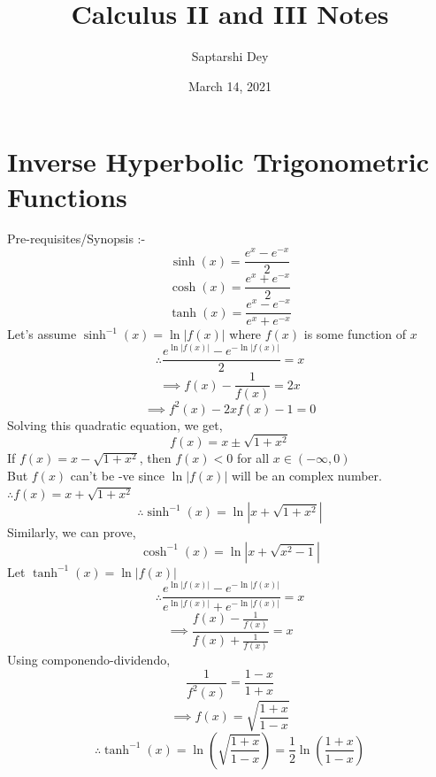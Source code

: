 \documentclass[14pt]{article}
\begin{document}
	\title{Calculus II and III Notes}
	\author{Saptarshi Dey}
	\date{March 14, 2021}
	\maketitle
	\section{Inverse Hyperbolic Trigonometric Functions}
	\large{Pre-requisites/Synopsis :-}
	\begin{equation}
		\sinh(x)=\frac{e^x-e^{-x}}{2}
	\end{equation}
	\begin{equation}
		\cosh(x)=\frac{e^x+e^{-x}}{2}
	\end{equation}
	\begin{equation}
		\tanh(x)=\frac{e^x-e^{-x}}{e^x+e^{-x}}
	\end{equation}
	Let's assume $\sinh^{-1}(x)=\ln|f(x)|$ where $f(x)$ is some function of $x$ 
	\\ \begin{equation*}
	\therefore \frac{e^{\ln|f(x)|}-e^{-\ln|f(x)|}}{2} = x	
	\end{equation*}
	\begin{equation*}					%
	\implies f(x)-\frac{1}{f(x)} = 2x		
	\end{equation*}
	\begin{equation*}
	\implies f^2(x)-2xf(x)-1 = 0		
	\end{equation*}
	Solving this quadratic equation, we get,
	\begin{equation*}
		f(x)=x\pm\sqrt{1+x^2}
	\end{equation*}
	If $f(x)=x-\sqrt{1+x^2}$, then $f(x)<0$ for all $x\in(-\infty,0)$
	\\ But $f(x)$ can't be -ve since $\ln|f(x)|$ will be an complex number.
	$\therefore f(x)=x+\sqrt{1+x^2}$
	\begin{equation}
		\therefore \boxed{\sinh^{-1}(x)=\ln|x+\sqrt{1+x^2}|}
	\end{equation}
	Similarly, we can prove,
	\begin{equation}
	\boxed{\cosh^{-1}(x)=\ln|x+\sqrt{x^2-1}|}
	\end{equation}
	Let $\tanh^{-1}(x)=\ln|f(x)|$
	\begin{equation*}
		\therefore \frac{e^{\ln|f(x)|}-e^{-\ln|f(x)|}}{e^{\ln|f(x)|}+e^{-\ln|f(x)|}}=x
	\end{equation*}
	\begin{equation*}
	\implies \frac{f(x)-\frac{1}{f(x)}}{f(x)+\frac{1}{f(x)}}=x
	\end{equation*}
	Using componendo-dividendo,
	\begin{equation*}
	\frac{1}{f^2(x)}=\frac{1-x}{1+x}
	\end{equation*}
	\begin{equation*}
	\implies f(x)=\sqrt{\frac{1+x}{1-x}}
	\end{equation*}
	\begin{equation}
	\therefore \boxed{\tanh^{-1}(x)=\ln\left(\sqrt{\frac{1+x}{1-x}}\right)=\frac{1}{2}\ln\left(\frac{1+x}{1-x}\right)}
	\end{equation}
\end{document}
